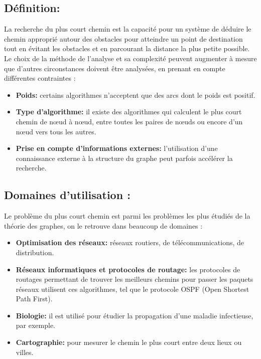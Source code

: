 \subsection{Définition:}
La recherche du plus court chemin est la capacité pour un système de déduire le chemin approprié autour des obstacles pour atteindre un point de destination tout en évitant les obstacles et en parcourant la distance la plus petite possible.
Le choix de la méthode de l'analyse et sa complexité peuvent augmenter à mesure que d'autres circonstances doivent être analysées, en prenant en compte différentes contraintes :

\begin{itemize}
	\item \textbf{Poids:} certains algorithmes n'acceptent que des arcs dont le poids est positif.
	\item \textbf{Type d'algorithme:} il existe des algorithmes qui calculent le plus court chemin de nœud à nœud, entre toutes les paires de nœuds ou encore d'un nœud vers tous les autres.
	\item \textbf{Prise en compte d'informations externes:} l'utilisation d'une connaissance externe à la structure du graphe peut parfois accélérer la recherche.
\end{itemize}

\subsection{Domaines d'utilisation :}
Le problème du plus court chemin est parmi les problèmes les plus étudiés de la théorie des graphes, on le retrouve dans beaucoup de domaines :
\begin{itemize}
\item\textbf{Optimisation des réseaux:} réseaux routiers, de télécommunications, de distribution.
\item\textbf{Réseaux informatiques et protocoles de routage: } les protocoles de routages permettant de trouver les meilleurs chemins pour passer les paquets réseaux utilisent ces algorithmes, tel que le protocole OSPF (Open Shortest Path First).
\item\textbf{Biologie:} il est utilisé pour étudier la propagation d'une maladie infectieuse, par exemple.
\item\textbf{Cartographie:} pour mesurer le chemin le plus court entre deux lieux ou villes.
\end{itemize}

